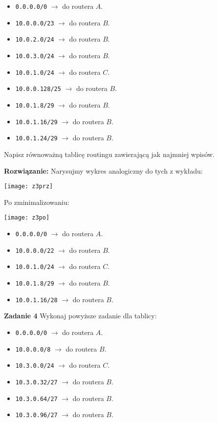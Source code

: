 \documentclass[12pt,a4paper]{article}
\begin{document}
\begin{itemize}
	\item \texttt{0.0.0.0/0} \(\rightarrow\) do routera \(A\).
	\item \texttt{10.0.0.0/23} \(\rightarrow\) do routera \(B\).
	\item \texttt{10.0.2.0/24} \(\rightarrow\) do routera \(B\).
	\item \texttt{10.0.3.0/24} \(\rightarrow\) do routera \(B\).
	\item \texttt{10.0.1.0/24} \(\rightarrow\) do routera \(C\).
	\item \texttt{10.0.0.128/25} \(\rightarrow\) do routera \(B\).
	\item \texttt{10.0.1.8/29} \(\rightarrow\) do routera \(B\).
	\item \texttt{10.0.1.16/29} \(\rightarrow\) do routera \(B\).
	\item \texttt{10.0.1.24/29} \(\rightarrow\) do routera \(B\).
\end{itemize}

Napisz równoważną tablicę routingu zawierającą jak najmniej wpisów.
\vskip 0.2cm

\noindent
\textbf{Rozwiązanie:} Narysujmy wykres analogiczny do tych z wykładu:

\begin{center}
	\texttt{[image: z3prz]}	
\end{center}

Po zminimalizowaniu:

\begin{center}
	\texttt{[image: z3po]}	
\end{center}

\begin{itemize}
	\item \texttt{0.0.0.0/0} \(\rightarrow\) do routera \(A\).
	\item \texttt{10.0.0.0/22} \(\rightarrow\) do routera \(B\).
	\item \texttt{10.0.1.0/24} \(\rightarrow\) do routera \(C\).
	\item \texttt{10.0.1.8/29} \(\rightarrow\) do routera \(B\).
	\item \texttt{10.0.1.16/28} \(\rightarrow\) do routera \(B\).
\end{itemize}

\newpage
\noindent
\textbf{Zadanie 4} Wykonaj powyższe zadanie dla tablicy:

\begin{itemize}
	\item \texttt{0.0.0.0/0} \(\rightarrow\) do routera \(A\).
	\item \texttt{10.0.0.0/8} \(\rightarrow\) do routera \(B\).
	\item \texttt{10.3.0.0/24} \(\rightarrow\) do routera \(C\).
	\item \texttt{10.3.0.32/27} \(\rightarrow\) do routera \(B\).
	\item \texttt{10.3.0.64/27} \(\rightarrow\) do routera \(B\).
	\item \texttt{10.3.0.96/27} \(\rightarrow\) do routera \(B\).
\end{itemize}
\end{document}

